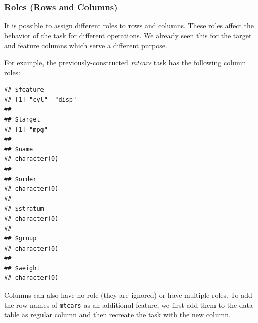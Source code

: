 \documentclass[
]{scrbook}
\newenvironment{Shaded}{\begin{snugshade}}{\end{snugshade}}
\newcommand{\AttributeTok}[1]{\textcolor[rgb]{0.77,0.63,0.00}{#1}}
\newcommand{\CommentTok}[1]{\textcolor[rgb]{0.56,0.35,0.01}{\textit{#1}}}
\newcommand{\ConstantTok}[1]{\textcolor[rgb]{0.00,0.00,0.00}{#1}}
\newcommand{\DecValTok}[1]{\textcolor[rgb]{0.00,0.00,0.81}{#1}}
\newcommand{\FunctionTok}[1]{\textcolor[rgb]{0.00,0.00,0.00}{#1}}
\newcommand{\NormalTok}[1]{#1}
\newcommand{\OtherTok}[1]{\textcolor[rgb]{0.56,0.35,0.01}{#1}}
\newcommand{\SpecialCharTok}[1]{\textcolor[rgb]{0.00,0.00,0.00}{#1}}
\newcommand{\StringTok}[1]{\textcolor[rgb]{0.31,0.60,0.02}{#1}}
\renewenvironment{Shaded} {\begin{snugshade}\small} {\end{snugshade}}
\begin{document}
\hypertarget{tasks-roles}{%
\subsubsection{Roles (Rows and Columns)}\label{tasks-roles}}

It is possible to assign different roles to rows and columns.
These roles affect the behavior of the task for different operations.
We already seen this for the target and feature columns which serve a different purpose.

For example, the previously-constructed \emph{mtcars} task has the following column roles:

\begin{Shaded}
\end{Shaded}

\begin{verbatim}
## $feature
## [1] "cyl"  "disp"
## 
## $target
## [1] "mpg"
## 
## $name
## character(0)
## 
## $order
## character(0)
## 
## $stratum
## character(0)
## 
## $group
## character(0)
## 
## $weight
## character(0)
\end{verbatim}

Columns can also have no role (they are ignored) or have multiple roles.
To add the row names of \texttt{mtcars} as an additional feature, we first add them to the data table as regular column and then recreate the task with the new column.

\begin{Shaded}
\end{Shaded}
\end{document}

